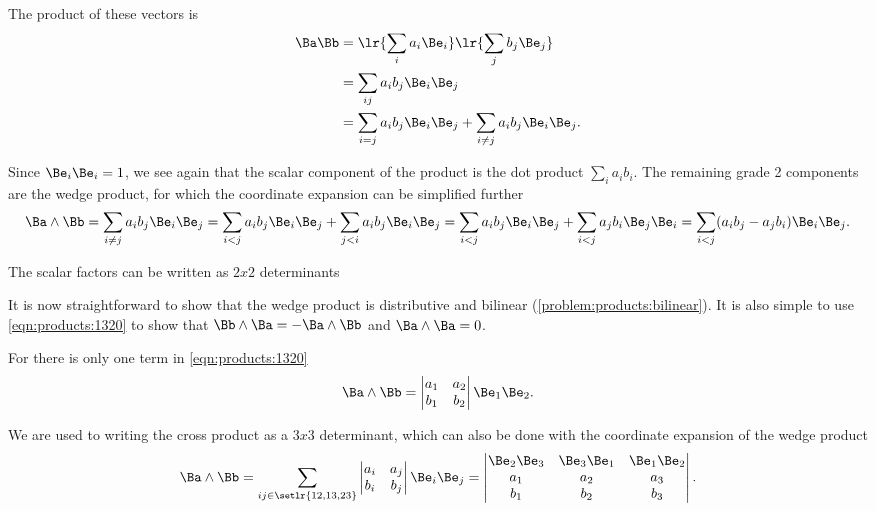 The product of these vectors is
\begin{equation}\label{eqn:products:1360}
\begin{aligned}
\Ba \Bb
&= \lr{ \sum_i a_i \Be_i } \lr{ \sum_j b_j \Be_j } \\
&= \sum_{ij} a_i b_j \Be_i \Be_j \\
&= \sum_{i = j} a_i b_j \Be_i \Be_j + \sum_{i \ne j} a_i b_j \Be_i \Be_j.
\end{aligned}
\end{equation}

Since \( \Be_i \Be_i = 1 \), we see again that the scalar component of the product is the dot product \( \sum_i a_i b_i \).
The remaining grade 2 components are the wedge product, for which the coordinate expansion can be simplified further
\begin{dmath}\label{eqn:products:1460}
\Ba \wedge \Bb
=
\sum_{i \ne j} a_i b_j \Be_i \Be_j
=
\sum_{i < j} a_i b_j \Be_i \Be_j
+
\sum_{j < i} a_i b_j \Be_i \Be_j
=
\sum_{i < j} a_i b_j \Be_i \Be_j
+
\sum_{i < j} a_j b_i \Be_j \Be_i
=
\sum_{i < j} (a_i b_j - a_j b_i) \Be_i \Be_j.
\end{dmath}

The scalar factors can be written as \( 2 x 2 \) determinants

It is now straightforward to show that the wedge product is distributive and bilinear (\cref{problem:products:bilinear}).
It is also simple to use \cref{eqn:products:1320} to show that \( \Bb \wedge \Ba = -\Ba \wedge \Bb \) and \( \Ba \wedge \Ba = 0 \).

For  there is only one term in \cref{eqn:products:1320}
\begin{equation}\label{eqn:products:1720}
\Ba \wedge \Bb
=
\begin{vmatrix}
a_1 & a_2 \\
b_1 & b_2
\end{vmatrix}
\Be_1 \Be_2.
\end{equation}

We are used to writing the cross product as a \( 3 x 3 \) determinant, which can also be done with the coordinate expansion of the
 wedge product
\begin{equation}\label{eqn:products:1740}
\Ba \wedge \Bb
=
\sum_{ ij \in \setlr{ 12, 13, 23 } }
\begin{vmatrix}
a_i & a_j \\
b_i & b_j
\end{vmatrix}
\Be_i \Be_j
=
\begin{vmatrix}
\Be_2 \Be_3 & \Be_3 \Be_1 & \Be_1 \Be_2 \\
a_1 & a_2 & a_3 \\
b_1 & b_2 & b_3 \\
\end{vmatrix}.
\end{equation}

